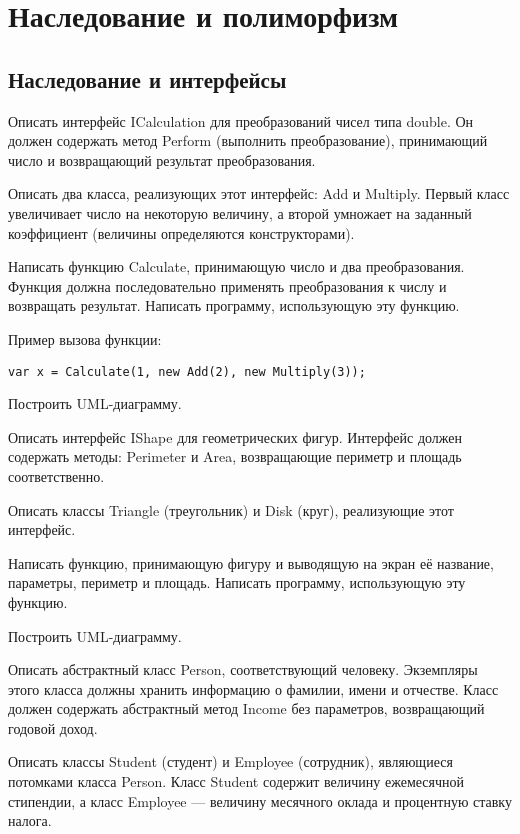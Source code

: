 \section{Наследование и полиморфизм}

\subsection{Наследование и интерфейсы}

\task Описать интерфейс ICalculation для преобразований чисел типа
double. Он должен содержать метод Perform (выполнить преобразование),
принимающий число и возвращающий результат преобразования.

Описать два класса, реализующих этот интерфейс: Add и Multiply. Первый
класс увеличивает число на некоторую величину, а второй умножает на
заданный коэффициент (величины определяются конструкторами).

Написать функцию Calculate, принимающую число и два
преобразования. Функция должна последовательно применять
преобразования к числу и возвращать результат. Написать программу,
использующую эту функцию.

Пример вызова функции:
\begin{lstlisting}[numbers=none]
var x = Calculate(1, new Add(2), new Multiply(3));
\end{lstlisting}

Построить UML-диаграмму.

\task Описать интерфейс IShape для геометрических фигур. Интерфейс
должен содержать методы: Perimeter и Area, возвращающие периметр и
площадь соответственно.

Описать классы Triangle (треугольник) и Disk (круг), реализующие этот
интерфейс.

Написать функцию, принимающую фигуру и выводящую на экран её название,
параметры, периметр и площадь. Написать программу, использующую эту
функцию.

Построить UML-диаграмму.

\task Описать абстрактный класс Person, соответствующий
человеку. Экземпляры этого класса должны хранить информацию о фамилии,
имени и отчестве. Класс должен содержать абстрактный метод Income без
параметров, возвращающий годовой доход.

Описать классы Student (студент) и Employee (сотрудник), являющиеся
потомками класса Person.  Класс Student содержит величину ежемесячной
стипендии, а класс Employee — величину месячного оклада и процентную
ставку налога.


